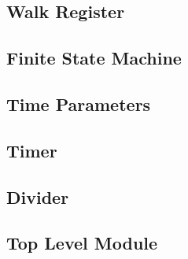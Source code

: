 \documentclass{article}
\begin{document}
	\newpage
	\subsection{Walk Register}
		\begin{lgrind}
		
		\end{lgrind}

	\newpage
	\subsection{Finite State Machine}
		\begin{lgrind}
		
		\end{lgrind}

	\newpage
	\subsection{Time Parameters}
		\begin{lgrind}
		
		\end{lgrind}

	\newpage
	\subsection{Timer}
		\begin{lgrind}
		
		\end{lgrind}

	\newpage
	\subsection{Divider}
		\begin{lgrind}
		
		\end{lgrind}

	\newpage
	\subsection{Top Level Module}
		\begin{lgrind}
		
		\end{lgrind}
\end{document}
